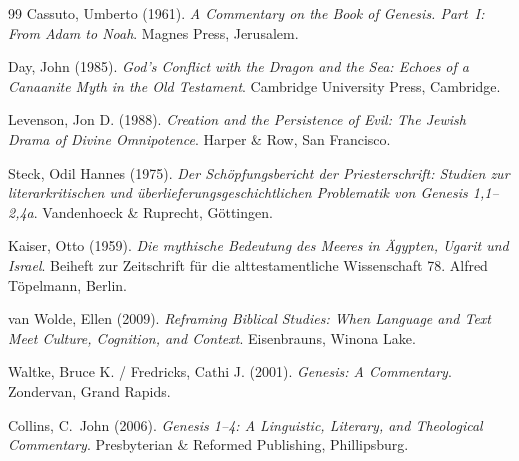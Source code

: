 ﻿\documentclass[a4paper,12pt]{article}
\theoremstyle{definition}
\begin{document}
\begin{thebibliography}{99}
	Cassuto, Umberto (1961).
	\textit{A Commentary on the Book of Genesis. Part~I: From Adam to Noah}.
	Magnes Press, Jerusalem.
	
	Day, John (1985).
	\textit{God's Conflict with the Dragon and the Sea:
		Echoes of a Canaanite Myth in the Old Testament}.
	Cambridge University Press, Cambridge.
	
	Levenson, Jon D. (1988).
	\textit{Creation and the Persistence of Evil:
		The Jewish Drama of Divine Omnipotence}.
	Harper \& Row, San Francisco.
	
	Steck, Odil Hannes (1975).
	\textit{Der Schöpfungsbericht der Priesterschrift:
		Studien zur literarkritischen und überlieferungsgeschichtlichen Problematik
		von Genesis 1,1--2,4a}.
	Vandenhoeck \& Ruprecht, Göttingen.
	
	Kaiser, Otto (1959).
	\textit{Die mythische Bedeutung des Meeres in Ägypten, Ugarit und Israel}.
	Beiheft zur Zeitschrift für die alttestamentliche Wissenschaft 78.
	Alfred Töpelmann, Berlin.
	
	van Wolde, Ellen (2009).
	\textit{Reframing Biblical Studies: When Language and Text Meet Culture,
		Cognition, and Context}.
	Eisenbrauns, Winona Lake.
	
	Waltke, Bruce K. / Fredricks, Cathi J. (2001).
	\textit{Genesis: A Commentary}.
	Zondervan, Grand Rapids.
	
	Collins, C.~John (2006).
	\textit{Genesis 1--4: A Linguistic, Literary, and Theological Commentary}.
	Presbyterian \& Reformed Publishing, Phillipsburg.
	
\end{thebibliography}
\end{document}
